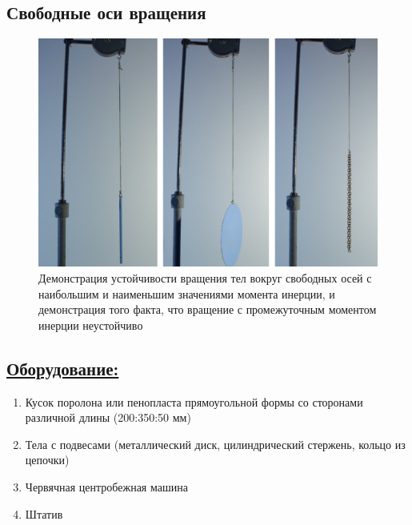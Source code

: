 \documentclass[14pt,a4paper,oneside]{extarticle}	%
\begin{document}

\begin{center}
	\subsection*{Свободные оси вращения}
\end{center}

\begin{figure}[H] 	%
	\centering 		%
	\includegraphics[width=0.9\linewidth]{freeaxis-1.png}
	\caption{Демонстрация устойчивости вращения тел вокруг свободных осей с наибольшим и наименьшим значениями момента инерции, и демонстрация того факта, что вращение с промежуточным моментом инерции неустойчиво}
	\label{freeaxis-1}
\end{figure}

\subsection*{\underline{Оборудование:}}

\begin{enumerate}
	\item Кусок поролона или пенопласта прямоугольной формы со сторонами различной длины (200:350:50 мм)
	\item Тела с подвесами (металлический диск, цилиндрический стержень, кольцо из цепочки)
	\item Червячная центробежная машина
	\item Штатив
\end{enumerate}
\end{document}
